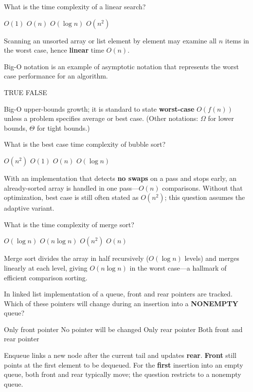 \question[4]
What is the time complexity of a linear search?
\begin{choices}
  \choice $O(1)$
  \CorrectChoice $O(n)$
  \choice $O(\log n)$
  \choice $O(n^2)$
\end{choices}
\begin{solution}
  Scanning an unsorted array or list element by element may examine all $n$ items in the worst case, hence \textbf{linear} time $O(n)$.
\end{solution}

\question[4]
Big-O notation is an example of asymptotic notation that represents the worst case performance for an algorithm.
\begin{choices}
  \CorrectChoice TRUE
  \choice FALSE
\end{choices}
\begin{solution}
  Big-O upper-bounds growth; it is standard to state \textbf{worst-case} $O(f(n))$ unless a problem specifies average or best case. (Other notations: $\Omega$ for lower bounds, $\Theta$ for tight bounds.)
\end{solution}

\question[4]
What is the best case time complexity of bubble sort?
\begin{choices}
  \choice $O(n^2)$
  \choice $O(1)$
  \CorrectChoice $O(n)$
  \choice $O(\log n)$
\end{choices}
\begin{solution}
  With an implementation that detects \textbf{no swaps} on a pass and stops early, an already-sorted array is handled in one pass---\textbf{$O(n)$} comparisons. Without that optimization, best case is still often stated as $O(n^2)$; this question assumes the adaptive variant.
\end{solution}

\question[4]
What is the time complexity of merge sort?
\begin{choices}
  \choice $O(\log n)$
  \CorrectChoice $O(n \log n)$
  \choice $O(n^2)$
  \choice $O(n)$
\end{choices}
\begin{solution}
  Merge sort divides the array in half recursively ($O(\log n)$ levels) and merges linearly at each level, giving \textbf{$O(n \log n)$} in the worst case---a hallmark of efficient comparison sorting.
\end{solution}

\question[4]
In linked list implementation of a queue, front and rear pointers are tracked. Which of these pointers will change during an insertion into a \textbf{NONEMPTY} queue?
\begin{choices}
  \choice Only front pointer
  \choice No pointer will be changed
  \CorrectChoice Only rear pointer
  \choice Both front and rear pointer
\end{choices}
\begin{solution}
  Enqueue links a new node after the current tail and updates \textbf{rear}. \textbf{Front} still points at the first element to be dequeued. For the \textbf{first} insertion into an empty queue, both front and rear typically move; the question restricts to a nonempty queue.
\end{solution}

